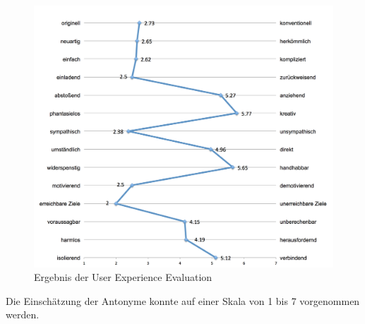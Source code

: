\begin{figure}[H]
    \centering
    \includegraphics[width=1\textwidth]{files/statistik/umfrage2Ergebnisse}
    \caption{Ergebnis der User Experience Evaluation}
    \label{pic:mySpecialUXEval}
\end{figure}
 
Die Einschätzung der Antonyme konnte auf einer Skala von 1 bis 7 vorgenommen werden. 


